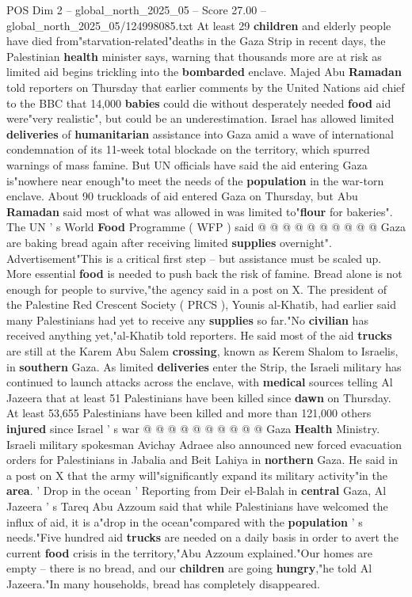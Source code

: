 \begin{textsample}{POS Dim 2 – global\_north\_2025\_05 – Score 27.00 – global\_north\_2025\_05/124998085.txt}  \label{ex:f2_pos_216}
At least 29 \textbf{children} and elderly people have died from"starvation-related"deaths in the Gaza Strip in recent days, the Palestinian \textbf{health} minister says, warning that thousands more are at risk as limited aid begins trickling into the \textbf{bombarded} enclave.
Majed Abu \textbf{Ramadan} told reporters on Thursday that earlier comments by the United Nations aid chief to the BBC that 14,000 \textbf{babies} could die without desperately needed \textbf{food} aid were"very realistic", but could be an underestimation.
Israel has allowed limited \textbf{deliveries} of \textbf{humanitarian} assistance into Gaza amid a wave of international condemnation of its 11-week total blockade on the territory, which spurred warnings of mass famine.
But UN officials have said the aid entering Gaza is"nowhere near enough"to meet the needs of the \textbf{population} in the war-torn enclave.
About 90 truckloads of aid entered Gaza on Thursday, but Abu \textbf{Ramadan} said most of what was allowed in was limited to"\textbf{flour} for bakeries".
The UN ' s World \textbf{Food} Programme ( WFP ) said @ @ @ @ @ @ @ @ @ @ Gaza are baking bread again after receiving limited \textbf{supplies} overnight".
Advertisement"This is a critical first step -- but assistance must be scaled up.
More essential \textbf{food} is needed to push back the risk of famine.
Bread alone is not enough for people to survive,"the agency said in a post on X.
The president of the Palestine Red Crescent Society ( PRCS ), Younis al-Khatib, had earlier said many Palestinians had yet to receive any \textbf{supplies} so far."No \textbf{civilian} has received anything yet,"al-Khatib told reporters.
He said most of the aid \textbf{trucks} are still at the Karem Abu Salem \textbf{crossing}, known as Kerem Shalom to Israelis, in \textbf{southern} Gaza.
As limited \textbf{deliveries} enter the Strip, the Israeli military has continued to launch attacks across the enclave, with \textbf{medical} sources telling Al Jazeera that at least 51 Palestinians have been killed since \textbf{dawn} on Thursday.
At least 53,655 Palestinians have been killed and more than 121,000 others \textbf{injured} since Israel ' s war @ @ @ @ @ @ @ @ @ @ Gaza \textbf{Health} Ministry.
Israeli military spokesman Avichay Adraee also announced new forced evacuation orders for Palestinians in Jabalia and Beit Lahiya in \textbf{northern} Gaza.
He said in a post on X that the army will"significantly expand its military activity"in the \textbf{area}. ' Drop in the ocean ' Reporting from Deir el-Balah in \textbf{central} Gaza, Al Jazeera ' s Tareq Abu Azzoum said that while Palestinians have welcomed the influx of aid, it is a"drop in the ocean"compared with the \textbf{population} ' s needs."Five hundred aid \textbf{trucks} are needed on a daily basis in order to avert the current \textbf{food} crisis in the territory,"Abu Azzoum explained."Our homes are empty -- there is no bread, and our \textbf{children} are going \textbf{hungry},"he told Al Jazeera."In many households, bread has completely disappeared.

\end{textsample}
